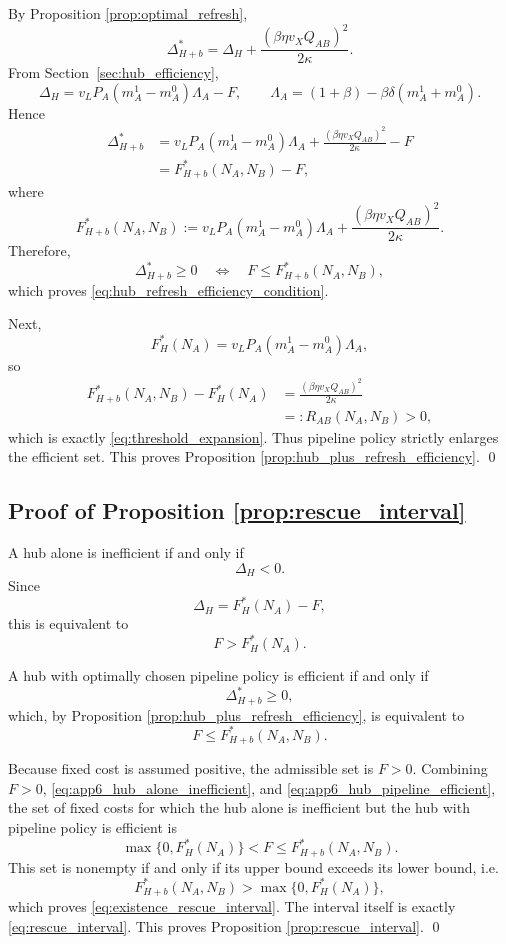 By Proposition \ref{prop:optimal_refresh},
\[
\Delta_{H+b}^*=
\Delta_H+\frac{(\beta\eta v_XQ_{AB})^2}{2\kappa}.
\]
From Section~\ref{sec:hub_efficiency},
\[
\Delta_H
=
v_LP_A(m_A^1-m_A^0)\Lambda_A-F,
\qquad
\Lambda_A=(1+\beta)-\beta\delta(m_A^1+m_A^0).
\]
Hence
\begin{align}
\Delta_{H+b}^*
&=
v_LP_A(m_A^1-m_A^0)\Lambda_A
+
\frac{(\beta\eta v_XQ_{AB})^2}{2\kappa}
-F
\nonumber\\
&=
F_{H+b}^*(N_A,N_B)-F,
\label{eq:app6_DeltaHb_star_F}
\end{align}
where
\begin{equation}
F_{H+b}^*(N_A,N_B)
:=
v_LP_A(m_A^1-m_A^0)\Lambda_A
+
\frac{(\beta\eta v_XQ_{AB})^2}{2\kappa}.
\label{eq:app6_FHbstar}
\end{equation}
Therefore,
\[
\Delta_{H+b}^*\ge 0
\quad\Longleftrightarrow\quad
F\le F_{H+b}^*(N_A,N_B),
\]
which proves \eqref{eq:hub_refresh_efficiency_condition}.

Next,
\[
F_H^*(N_A)=v_LP_A(m_A^1-m_A^0)\Lambda_A,
\]
so
\begin{align}
F_{H+b}^*(N_A,N_B)-F_H^*(N_A)
&=
\frac{(\beta\eta v_XQ_{AB})^2}{2\kappa}
\nonumber\\
&=:
R_{AB}(N_A,N_B)
>0,
\label{eq:app6_threshold_gap}
\end{align}
which is exactly \eqref{eq:threshold_expansion}. Thus pipeline policy strictly enlarges the efficient set. This proves Proposition \ref{prop:hub_plus_refresh_efficiency}.
\qed

\subsection{Proof of Proposition \ref{prop:rescue_interval}}

A hub alone is inefficient if and only if
\[
\Delta_H<0.
\]
Since
\[
\Delta_H=F_H^*(N_A)-F,
\]
this is equivalent to
\begin{equation}
F>F_H^*(N_A).
\label{eq:app6_hub_alone_inefficient}
\end{equation}

A hub with optimally chosen pipeline policy is efficient if and only if
\[
\Delta_{H+b}^*\ge 0,
\]
which, by Proposition \ref{prop:hub_plus_refresh_efficiency}, is equivalent to
\begin{equation}
F\le F_{H+b}^*(N_A,N_B).
\label{eq:app6_hub_pipeline_efficient}
\end{equation}

Because fixed cost is assumed positive, the admissible set is $F>0$. Combining $F>0$, \eqref{eq:app6_hub_alone_inefficient}, and \eqref{eq:app6_hub_pipeline_efficient}, the set of fixed costs for which the hub alone is inefficient but the hub with pipeline policy is efficient is
\[
\max\{0,F_H^*(N_A)\}<F\le F_{H+b}^*(N_A,N_B).
\]
This set is nonempty if and only if its upper bound exceeds its lower bound, i.e.
\[
F_{H+b}^*(N_A,N_B)>\max\{0,F_H^*(N_A)\},
\]
which proves \eqref{eq:existence_rescue_interval}. The interval itself is exactly \eqref{eq:rescue_interval}. This proves Proposition \ref{prop:rescue_interval}.
\qed

